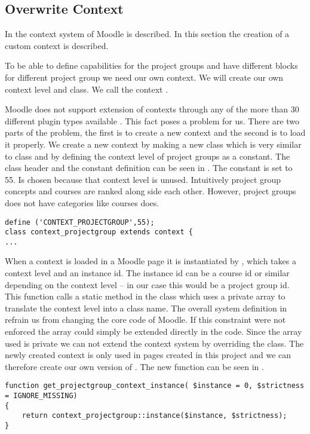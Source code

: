 \subsection{Overwrite Context}
In   the context system of Moodle is described.
In this section the creation of a custom context is described. 

To be able to define capabilities for the project groups and have different blocks for different project group we need our own context.
We will create our own context level and class.
We call the context . 

Moodle does not support extension of contexts through any of the more than 30 different plugin types available \cite{plugin}. 
This fact poses a problem for us.
There are two parts of the problem, the first is to create a new context and the second is to load it properly. 
We create a new context by making a new class which is very similar to  class and by defining the context level of project groups as a constant. 
The class header and the constant definition can be seen in . 
The constant is set to 55.
Is chosen because that context level is unused.
Intuitively project group concepts and courses are ranked along side each other.
However, project groups does not have categories like courses does.

\begin{lstlisting}[style=phpCode, caption=\myCaption{The context\_projectgroup class header and constant definition}, label=codeprojectgroupcontext]
define ('CONTEXT_PROJECTGROUP',55);
class context_projectgroup extends context {
...
\end{lstlisting}

When a context is loaded in a Moodle page it is instantiated by , which takes a context level and an instance id. 
The instance id can be a course id or similar depending on the context level -- in our case this would be a project group id. 
This function calls a static method in the  class which uses a private array to translate the context level into a class name.
The overall system definition in  refrain us from changing the core code of Moodle. 
If this constraint were not enforced the array could simply be extended directly in the code.  
Since the array used is private we can not extend the context system by overriding the  class. 
The newly created context is only used in pages created in this project and we can therefore create our own version of . 
The new function can be seen in .
\begin{lstlisting}[style=phpCode, caption=\myCaption{The function to get projectgroup context}, label=codeprojectgroupcontextinstance]
function get_projectgroup_context_instance( $instance = 0, $strictness = IGNORE_MISSING) 
{ 
    return context_projectgroup::instance($instance, $strictness);
}
\end{lstlisting}

